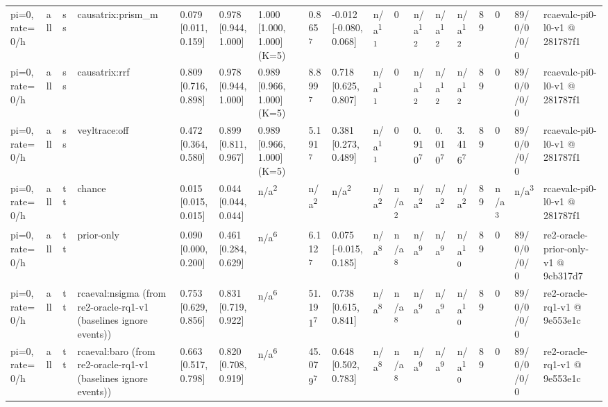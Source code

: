 \begin{table}[t]
\begin{tabular}{llllllllllllllllll}
pi=0, rate=0/h & all & ss & causatrix:prism\_m & 0.079 [0.011, 0.159] & 0.978 [0.944, 1.000] & 1.000 [1.000, 1.000] (K=5) & 0.865\textsuperscript{7} & -0.012 [-0.080, 0.068] & n/a\textsuperscript{11} & 0 & n/a\textsuperscript{12} & n/a\textsuperscript{12} & n/a\textsuperscript{12} & 89 & 0 & 89/0/0/0/0 & rcaevalc-pi0-l0-v1 @ 281787f1 \\
pi=0, rate=0/h & all & ss & causatrix:rrf & 0.809 [0.716, 0.898] & 0.978 [0.944, 1.000] & 0.989 [0.966, 1.000] (K=5) & 8.899\textsuperscript{7} & 0.718 [0.625, 0.807] & n/a\textsuperscript{11} & 0 & n/a\textsuperscript{12} & n/a\textsuperscript{12} & n/a\textsuperscript{12} & 89 & 0 & 89/0/0/0/0 & rcaevalc-pi0-l0-v1 @ 281787f1 \\
pi=0, rate=0/h & all & ss & veyltrace:off & 0.472 [0.364, 0.580] & 0.899 [0.811, 0.967] & 0.989 [0.966, 1.000] (K=5) & 5.191\textsuperscript{7} & 0.381 [0.273, 0.489] & n/a\textsuperscript{11} & 0 & 0.910\textsuperscript{7} & 0.010\textsuperscript{7} & 3.416\textsuperscript{7} & 89 & 0 & 89/0/0/0/0 & rcaevalc-pi0-l0-v1 @ 281787f1 \\
pi=0, rate=0/h & all & tt & chance & 0.015 [0.015, 0.015] & 0.044 [0.044, 0.044] & n/a\textsuperscript{2} & n/a\textsuperscript{2} & n/a\textsuperscript{2} & n/a\textsuperscript{2} & n/a\textsuperscript{2} & n/a\textsuperscript{2} & n/a\textsuperscript{2} & n/a\textsuperscript{2} & 89 & n/a\textsuperscript{3} & n/a\textsuperscript{3} & rcaevalc-pi0-l0-v1 @ 281787f1 \\
pi=0, rate=0/h & all & tt & prior-only & 0.090 [0.000, 0.200] & 0.461 [0.284, 0.629] & n/a\textsuperscript{6} & 6.112\textsuperscript{7} & 0.075 [-0.015, 0.185] & n/a\textsuperscript{8} & n/a\textsuperscript{8} & n/a\textsuperscript{9} & n/a\textsuperscript{9} & n/a\textsuperscript{10} & 89 & 0 & 89/0/0/0/0 & re2-oracle-prior-only-v1 @ 9cb317d7 \\
pi=0, rate=0/h & all & tt & rcaeval:nsigma (from re2-oracle-rq1-v1 (baselines ignore events)) & 0.753 [0.629, 0.856] & 0.831 [0.719, 0.922] & n/a\textsuperscript{6} & 51.191\textsuperscript{7} & 0.738 [0.615, 0.841] & n/a\textsuperscript{8} & n/a\textsuperscript{8} & n/a\textsuperscript{9} & n/a\textsuperscript{9} & n/a\textsuperscript{10} & 89 & 0 & 89/0/0/0/0 & re2-oracle-rq1-v1 @ 9e553e1c \\
pi=0, rate=0/h & all & tt & rcaeval:baro (from re2-oracle-rq1-v1 (baselines ignore events)) & 0.663 [0.517, 0.798] & 0.820 [0.708, 0.919] & n/a\textsuperscript{6} & 45.079\textsuperscript{7} & 0.648 [0.502, 0.783] & n/a\textsuperscript{8} & n/a\textsuperscript{8} & n/a\textsuperscript{9} & n/a\textsuperscript{9} & n/a\textsuperscript{10} & 89 & 0 & 89/0/0/0/0 & re2-oracle-rq1-v1 @ 9e553e1c \\

\end{tabular}
\end{table}
